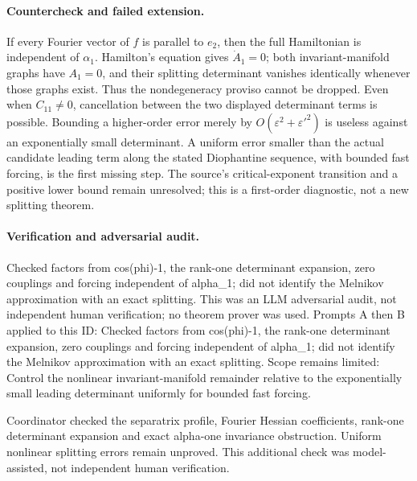 \documentclass[11pt]{article}
\begin{document}
\paragraph{Countercheck and failed extension.}If every Fourier vector of \(f\) is parallel to \(e_2\), then the full Hamiltonian is independent of \(\alpha_1\). Hamilton's equation gives \(\dot A_1=0\); both invariant-manifold graphs have \(A_1=0\), and their splitting determinant vanishes identically whenever those graphs exist. Thus the nondegeneracy proviso cannot be dropped. Even when \(C_{11}\ne0\), cancellation between the two displayed determinant terms is possible. Bounding a higher-order error merely by \(O(\varepsilon^2+\varepsilon'^2)\) is useless against an exponentially small determinant. A uniform error smaller than the actual candidate leading term along the stated Diophantine sequence, with bounded fast forcing, is the first missing step. The source's critical-exponent transition and a positive lower bound remain unresolved; this is a first-order diagnostic, not a new splitting theorem.

\paragraph{Verification and adversarial audit.}
Checked factors from cos(phi)-1, the rank-one determinant expansion, zero couplings and forcing independent of alpha\_1; did not identify the Melnikov approximation with an exact splitting. This was an LLM adversarial audit, not independent human verification; no theorem prover was used. Prompts A then B applied to this ID: Checked factors from cos(phi)-1, the rank-one determinant expansion, zero couplings and forcing independent of alpha\_1; did not identify the Melnikov approximation with an exact splitting. Scope remains limited: Control the nonlinear invariant-manifold remainder relative to the exponentially small leading determinant uniformly for bounded fast forcing.

Coordinator checked the separatrix profile, Fourier Hessian coefficients, rank-one determinant expansion and exact alpha-one invariance obstruction. Uniform nonlinear splitting errors remain unproved. This additional check was model-assisted, not independent human verification.
\end{document}
